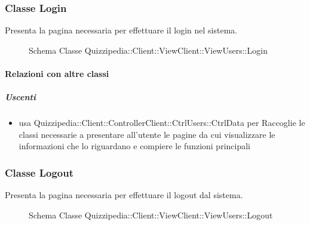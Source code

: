 \subsubsection{Classe Login}
Presenta la pagina necessaria per effettuare il login nel sistema.
\begin{figure}[H]
\centering
\noindent{}
\caption[Schema Classe Login]{Schema Classe Quizzipedia::Client::ViewClient::ViewUsers::Login}
\end{figure}
\paragraph{Relazioni con altre classi}
\subparagraph{Uscenti}
\begin{itemize}
\item usa Quizzipedia::Client::ControllerClient::CtrlUsers::CtrlData per Raccoglie le classi necessarie a presentare all'utente le pagine da cui visualizzare le informazioni che lo riguardano e compiere le funzioni principali
\end{itemize}
\subsubsection{Classe Logout}
Presenta la pagina necessaria per effettuare il logout dal sistema.
\begin{figure}[H]
\centering
\noindent{}
\caption[Schema Classe Logout]{Schema Classe Quizzipedia::Client::ViewClient::ViewUsers::Logout}
\end{figure}
